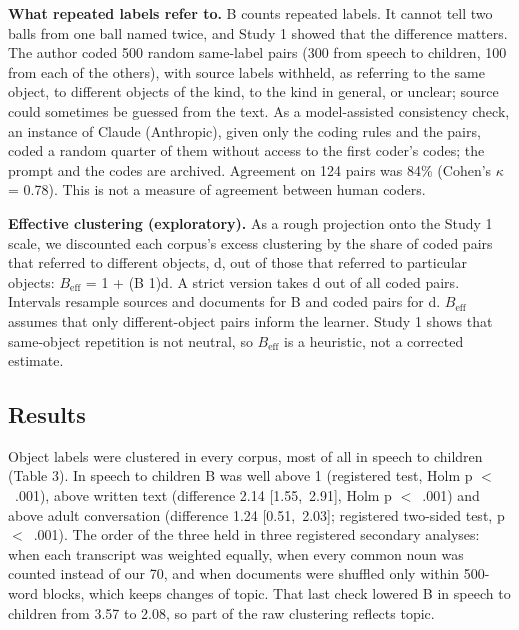 \textbf{What repeated labels refer to.} B counts repeated labels. It cannot tell two balls from one ball named twice, and Study 1 showed that the difference matters. The author coded 500 random same-label pairs (300 from speech to children, 100 from each of the others), with source labels withheld, as referring to the same object, to different objects of the kind, to the kind in general, or unclear; source could sometimes be guessed from the text. As a model-assisted consistency check, an instance of Claude (Anthropic), given only the coding rules and the pairs, coded a random quarter of them without access to the first coder's codes; the prompt and the codes are archived. Agreement on 124 pairs was 84\% (Cohen's $\kappa$ = 0.78). This is not a measure of agreement between human coders.

\textbf{Effective clustering (exploratory).} As a rough projection onto the Study 1 scale, we discounted each corpus's excess clustering by the share of coded pairs that referred to different objects, d, out of those that referred to particular objects: $B_{\mathrm{eff}}$ = 1 + (B \textminus{} 1)d. A strict version takes d out of all coded pairs. Intervals resample sources and documents for B and coded pairs for d. $B_{\mathrm{eff}}$ assumes that only different-object pairs inform the learner. Study 1 shows that same-object repetition is not neutral, so $B_{\mathrm{eff}}$ is a heuristic, not a corrected estimate.

\subsection{Results}
Object labels were clustered in every corpus, most of all in speech to children (Table 3). In speech to children B was well above 1 (registered test, Holm p $<$~.001), above written text (difference 2.14 [1.55,~2.91], Holm p $<$~.001) and above adult conversation (difference 1.24 [0.51,~2.03]; registered two-sided test, p $<$~.001). The order of the three held in three registered secondary analyses: when each transcript was weighted equally, when every common noun was counted instead of our 70, and when documents were shuffled only within 500-word blocks, which keeps changes of topic. That last check lowered B in speech to children from 3.57 to 2.08, so part of the raw clustering reflects topic.

